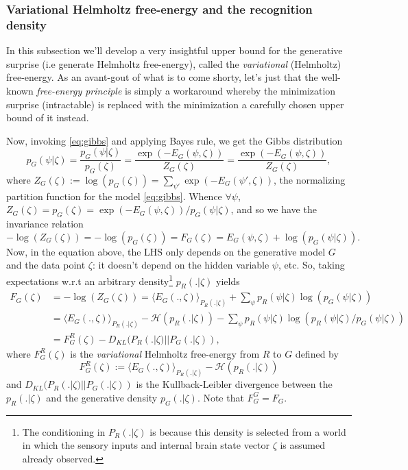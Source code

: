 \documentclass{article} %
\begin{document}
\subsubsection{Variational Helmholtz free-energy and the recognition density}
In this subsection we'll develop a very insightful upper bound for the generative surprise (i.e generate Helmholtz free-energy), called the \textit{variational} (Helmholtz) free-energy. As an avant-gout of what is to come shorty, let's just that the well-known \textit{free-energy principle} is simply a workaround whereby the minimization surprise (intractable) is replaced with the  minimization a carefully chosen upper bound of it instead.

Now, invoking \eqref{eq:gibbs} and applying Bayes rule, we get the Gibbs
distribution
\begin{equation}
  p_G(\psi|\zeta) = \frac{p_G(\psi|\zeta)}{p_G(\zeta)} = \frac{\exp(-E_G(\psi, \zeta))}{Z_G(\zeta)} = \frac{\exp(-E_G(\psi, \zeta))}{Z_G(\zeta)},
\end{equation}
where $Z_G(\zeta) := \log(p_G(\zeta)) = \sum_{\psi'}\exp(-E_G(\psi',\zeta))$, the normalizing partition function for the model \ref{eq:gibbs}.
Whence $\forall \psi$, $Z_G(\zeta) = p_G(\zeta) = \exp(-E_G(\psi, \zeta)) / p_G(\psi|\zeta)$, and so we have the invariance relation
\begin{equation}
  -\log(Z_G(\zeta)) = -\log(p_G(\zeta)) = F_G(\zeta) = E_G(\psi, \zeta) + \log(p_G(\psi|\zeta)).
  \end{equation}
Now, in the equation above, the LHS only depends on the generative model $G$ and the data point $\zeta$: it doesn't depend on the hidden variable $\psi$, etc. So, taking expectations w.r.t an arbitrary density\footnote{The conditioning in $P_R(.|\zeta)$ is because this density is selected from a world in which the sensory inputs and internal brain state vector $\zeta$ is assumed already observed.} $p_R(.|\zeta)$ yields
\begin{equation}
  \begin{split}
    F_G(\zeta) &= -\log(Z_G(\zeta)) = \langle E_G(., \zeta)\rangle_{P_R(.|\zeta)} + \sum_{\psi}p_R(\psi|\zeta)\log(p_G(\psi|\zeta))\\
    &= \langle E_G(., \zeta)\rangle_{P_R(.|\zeta)} - \mathcal H(p_R(.|\zeta)) - \sum_{\psi}p_R(\psi|\zeta)\log(p_R(\psi|\zeta)/p_G(\psi|\zeta))\\
    &= F^R_G(\zeta) - D_{KL}(P_R(.|\zeta) || P_G(.|\zeta)),
  \end{split}
  \label{eq:fe}
\end{equation}
where $F^R_G(\zeta)$ is the \textit{variational} Helmholtz free-energy from $R$ to $G$ defined by
\begin{equation}
  F^R_G(\zeta) := \langle E_G(., \zeta)\rangle_{P_R(.|\zeta)} - \mathcal H(p_R(.|\zeta))
\end{equation}
and $D_{KL}(P_R(.|\zeta) || P_G(.|\zeta))$ is the Kullback-Leibler divergence between the $p_R(.|\zeta)$ and the generative density $p_G(.|\zeta)$. Note that $F^G_G = F_G$.
\end{document}
